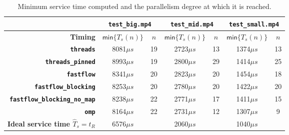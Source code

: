 \documentclass{article}
\begin{document}
\begin{table}[H]
\centering
\begin{tabular}{r||c|c|c|c|c|c}
\hline
                 & \multicolumn{2}{c|}{\textbf{\texttt{test\_big.mp4}}} & \multicolumn{2}{c|}{\textbf{\texttt{test\_mid.mp4}}} & \multicolumn{2}{c}{\textbf{\texttt{test\_small.mp4}}} \\\hline
\textbf{Timing}              & $\textsf{min}\{T_s(n)\}$ & $n$ &     $\textsf{min}\{T_s(n)\}$ & $n$ & $\textsf{min}\{T_s(n)\}$ & $n$\\\hline
\textbf{\texttt{threads}}                               & 8081$\mu s$ & 19 &	2723$\mu s$ & 13 &	1374$\mu s$ & 13 \\	
\textbf{\texttt{threads\_pinned}}                       & 8993$\mu s$ & 19 &	2800$\mu s$ & 29 &	1414$\mu s$ & 25 \\	
\textbf{\texttt{fastflow}}                              & 8341$\mu s$ & 20 &	2823$\mu s$ & 20 &	1454$\mu s$ & 18 \\	
\textbf{\texttt{fastflow\_blocking}}                    & 8253$\mu s$ & 20 &	2780$\mu s$ & 20 &	1422$\mu s$ & 20 \\	
\textbf{\texttt{fastflow\_blocking\_no\_map}}           & 8238$\mu s$ & 22 &	2771$\mu s$ & 17 &	1411$\mu s$ & 15 \\	
\textbf{\texttt{omp}}                                   & 8164$\mu s$ & 22 &	2731$\mu s$ & 12 &	1307$\mu s$ & 9  \\	\hline
\textbf{Ideal service time $\widehat T_s = t_R$} & 6576$\mu s$ &    & 2060$\mu s$ &    & 1040$\mu s$ &    \\
\hline
  \end{tabular}
\caption{Minimum service time computed and the parallelism degree at which it is reached.}
\label{tbl:service_time_results}
\end{table}

\vspace{-3em}

\appendix
\end{document}
